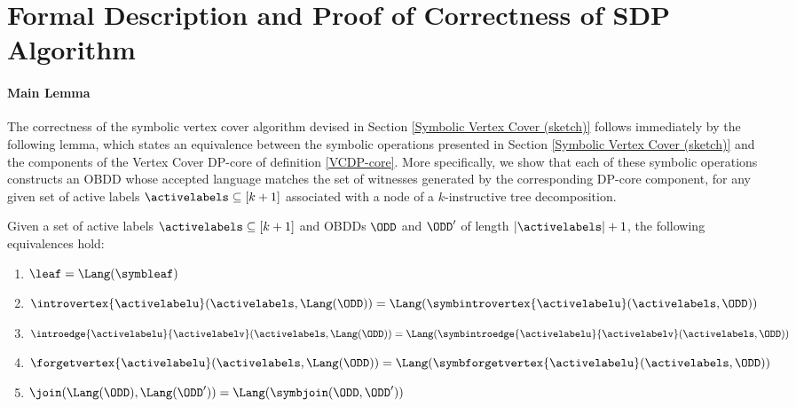 

\section{Formal Description and Proof of Correctness of SDP Algorithm}\label{app:ProofofSDP-core}

\paragraph*{Main Lemma}

The correctness of the symbolic vertex cover algorithm devised in Section \ref{Symbolic Vertex Cover (sketch)} follows immediately by the following lemma, which states an equivalence between the symbolic operations presented in Section \ref{Symbolic Vertex Cover (sketch)} and the components of the {\sc Vertex Cover} DP-core of definition \ref{VCDP-core}. More specifically, we show that each of these symbolic operations constructs an OBDD whose accepted language matches the set of witnesses generated by the corresponding DP-core component, for any given set of active labels $\activelabels \subseteq [k+1]$ associated with a node of a $k$-instructive tree decomposition.

\begin{lemma}
\label{lemma:mainLemma}
    Given a set of active labels $\activelabels \subseteq [k+1]$ and OBDDs $\ODD$ and $\ODD'$ of length $|\activelabels|+1$, the following equivalences hold:
\begin{enumerate}[label=\arabic*.,left=0pt,labelsep=2pt]
\item \label{mainLeaf} $\leaf = \Lang(\symbleaf)$
\item \label{mainIntroVertex} $\introvertex{\activelabelu}(\activelabels, \Lang(\ODD)) = \Lang(\symbintrovertex{\activelabelu}(\activelabels,\ODD))$
\item \label{mainIntroEdge}$\introedge{\activelabelu}{\activelabelv}(\activelabels,\Lang(\ODD)) = \Lang(\symbintroedge{\activelabelu}{\activelabelv}(\activelabels,\ODD))$
\item \label{mainForgetVertex} $\forgetvertex{\activelabelu}(\activelabels,\Lang(\ODD)) = \Lang(\symbforgetvertex{\activelabelu}(\activelabels,\ODD))$
\item \label{mainJoin} $\join(\Lang(\ODD),\Lang(\ODD')) = \Lang(\symbjoin(\ODD,\ODD'))$
\end{enumerate}
\end{lemma}

